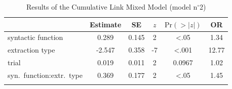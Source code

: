 \begin{table}
\begin{tabularx}{\textwidth}{Q S[table-format=-1.3] S[table-format=1.3] S[table-format=-1] S[table-format=<1.4] S[table-format=2.2]}
  \lsptoprule
 & {Estimate} & {SE} & {$z$} & {$\text{Pr}(>|z|)$} & {OR} \\ 
  \midrule
  syntactic function & 0.289 & 0.145 & 2 & <.05 & 1.34 \\ 
  extraction type & -2.547 & 0.358 & -7 & <.001 & 12.77 \\ 
  trial & 0.019 & 0.011 & 2 & 0.0967 & 1.02 \\ 
  syn.\ function:extr.\ type & 0.369 & 0.177 & 2 & <.05 & 1.45 \\ 
   \lspbottomrule
\end{tabularx}
\caption{Results of the Cumulative Link Mixed Model (model n$^{\circ}$2)}
\label{tab:exp14-m2}
\end{table}

